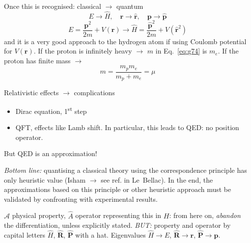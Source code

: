 \documentclass[12pt]{article}
\newcommand{\be}{\begin{equation}}
\newcommand{\ee}{\end{equation}}
\begin{document}
Once this is recognised: classical $\to$ quantum
\be
E \rightarrow \hat{H},\quad \mathbf{r} \rightarrow \hat{\mathbf{r}},\quad \mathbf{p} \rightarrow \hat{\mathbf{p}}
\ee
\be
E=\frac{\mathbf{p}^{2}}{2 m}+V\left(\mathbf{r}\right) 
\rightarrow 
\hat{H}=\frac{\hat{\mathbf{p}}^{2}}{2 m}+V\left(\hat{\mathbf{r}}^{2}\right)
\label{eq:g74}
\ee
and it is a very good approach to the hydrogen atom
if using Coulomb potential
for $V(\mathbf{r})$.
If the proton is infinitely heavy $\to$ $m$ in Eq.~\ref{eq:g74} is $m_e$.
If the proton has finite mass $\to$
\be
m = \frac{m_{p} m_{e}}{m_{p}+m_{e}}=\mu
\ee 


Relativistic effects $\to$ complications
\begin{itemize}
\item Dirac equation, 1\textsuperscript{st} step
\item QFT, effects like Lamb shift. In particular, this leads to 
QED: no position operator.
\end{itemize}
But QED is an approximation!

\emph{Bottom line:} quantising a classical theory
using the correspondence principle has
only heuristic value (Isham $\to$ see ref. in Le~Bellac).
In the end, the approximations based 
on this principle or other heuristic
approach must be validated by confronting
with experimental results.

$\mathcal{A}$ physical property, $\hat{A}$ operator representing
this in $H$: from here on, \emph{abandon} the
differentiation, unless explicitly stated.
\emph{BUT:} property and operator by capital 
letters $\hat{H}$, $\hat{\mathbf{R}}$, $\hat{\mathbf{P}}$ with a hat.
Eigenvalues $\hat{H} \to E$, $\hat{\mathbf{R}} \to \mathbf{r}$, $\hat{\mathbf{P}} \to \mathbf{p}$.
\end{document}
